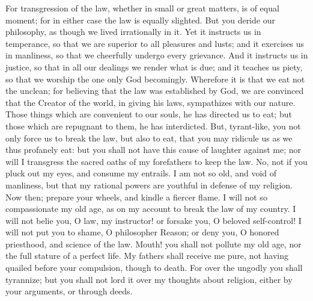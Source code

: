 {For transgression of the law, whether in small or great matters, is of equal moment;
for in either case the law is equally slighted.
But you deride our philosophy, as though we lived irrationally in it.
Yet it instructs us in temperance, so that we are superior to all pleasures and lusts; and it exercises us in manliness, so that we cheerfully undergo every grievance.
And it instructs us in justice, so that in all our dealings we render what is due; and it teaches us piety, so that we worship the one only God becomingly.
Wherefore it is that we eat not the unclean; for believing that the law was established by God, we are convinced that the Creator of the world, in giving his laws, sympathizes with our nature.
Those things which are convenient to our souls, he has directed us to eat; but those which are repugnant to them, he has interdicted.
But, tyrant-like, you not only force us to break the law, but also to eat, that you may ridicule us as we thus profanely eat:
but you shall not have this cause of laughter against me;
nor will I transgress the sacred oaths of my forefathers to keep the law.
No, not if you pluck out my eyes, and consume my entrails.
I am not so old, and void of manliness, but that my rational powers are youthful in defense of my religion.
Now then; prepare your wheels, and kindle a fiercer flame.
I will not so compassionate my old age, as on my account to break the law of my country.
I will not belie you, O law, my instructor! or forsake you, O beloved self-control!
I will not put you to shame, O philosopher Reason; or deny you, O honored priesthood, and science of the law.
Mouth! you shall not pollute my old age, nor the full stature of a perfect life.
My fathers shall receive me pure, not having quailed before your compulsion, though to death.
For over the ungodly you shall tyrannize; but you shall not lord it over my thoughts about religion, either by your arguments, or through deeds.

}

